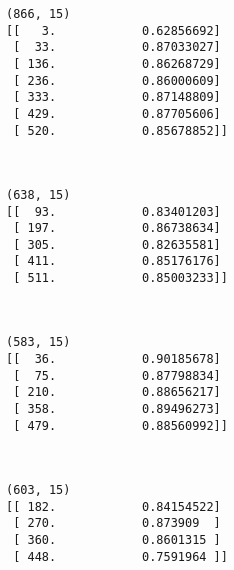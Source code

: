 \documentclass{article}
\begin{document}
    \begin{Verbatim}[commandchars=\\\{\}]
(866, 15)
[[   3.            0.62856692]
 [  33.            0.87033027]
 [ 136.            0.86268729]
 [ 236.            0.86000609]
 [ 333.            0.87148809]
 [ 429.            0.87705606]
 [ 520.            0.85678852]]
    \end{Verbatim}

    \begin{center}
    \end{center}
    { \hspace*{\fill} \\}
    
    \begin{Verbatim}[commandchars=\\\{\}]
(638, 15)
[[  93.            0.83401203]
 [ 197.            0.86738634]
 [ 305.            0.82635581]
 [ 411.            0.85176176]
 [ 511.            0.85003233]]
    \end{Verbatim}

    \begin{center}
    \end{center}
    { \hspace*{\fill} \\}
    
    \begin{Verbatim}[commandchars=\\\{\}]
(583, 15)
[[  36.            0.90185678]
 [  75.            0.87798834]
 [ 210.            0.88656217]
 [ 358.            0.89496273]
 [ 479.            0.88560992]]
    \end{Verbatim}

    \begin{center}
    \end{center}
    { \hspace*{\fill} \\}
    
    \begin{Verbatim}[commandchars=\\\{\}]
(603, 15)
[[ 182.            0.84154522]
 [ 270.            0.873909  ]
 [ 360.            0.8601315 ]
 [ 448.            0.7591964 ]]
    \end{Verbatim}
\end{document}
